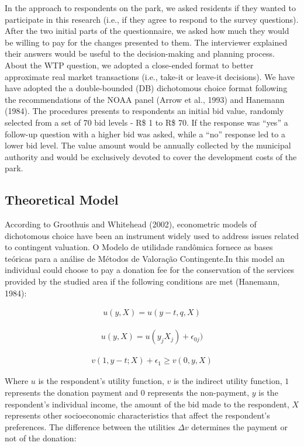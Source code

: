 \documentclass[
]{article}
\begin{document}
In the approach to respondents on the park, we asked residents if they
wanted to participate in this research (i.e., if they agree to respond
to the survey questions). After the two initial parts of the
questionnaire, we asked how much they would be willing to pay for the
changes presented to them. The interviewer explained their answers would
be useful to the decision-making and planning process. About the WTP
question, we adopted a close-ended format to better approximate real
market transactions (i.e., take-it or leave-it decisions). We have have
adopted the a double-bounded (DB) dichotomous choice format following
the recommendations of the NOAA panel (Arrow et al., 1993) and Hanemann
(1984). The procedures presents to respondents an initial bid value,
randomly selected from a set of 70 bid levels - R\$ 1 to R\$ 70. If the
response was ``yes'' a follow-up question with a higher bid was asked,
while a ``no'' response led to a lower bid level. The value amount would
be annually collected by the municipal authority and would be
exclusively devoted to cover the development costs of the park.

\hypertarget{theoretical-model}{%
\subsection{Theoretical Model}\label{theoretical-model}}

According to Groothuis and Whitehead (2002), econometric models of
dichotomous choice have been an instrument widely used to address issues
related to contingent valuation. O Modelo de utilidade randômica fornece
as bases teóricas para a análise de Métodos de Valoração Contingente.In
this model an individual could choose to pay a donation fee for the
conservation of the services provided by the studied area if the
following conditions are met (Hanemann, 1984):

\begin{align}
u(y, X) = u(y-t, q, X)
\end{align}

\begin{align}
u(y, X) = u(y_{j}X_{j}) + \epsilon_{0j})
\end{align}

\begin{align}
v(1, y-t; X) + \epsilon_{1} \ge v(0, y, X)
\end{align}

Where \(u\) is the respondent's utility function, \(v\) is the indirect
utility function, \(1\) represents the donation payment and \(0\)
represents the non-payment, \(y\) is the respondent's individual income,
the amount of the bid made to the respondent, \(X\) represents other
socioeconomic characteristics that affect the respondent's preferences.
The difference between the utilities \(\Delta v\) determines the payment
or not of the donation:
\end{document}
